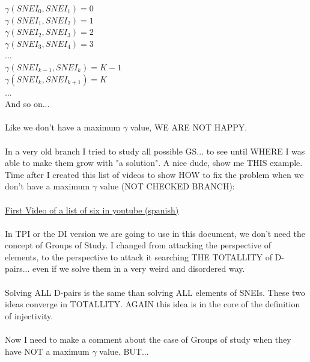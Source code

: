 		\noindent
		$\gamma(SNEI_{0}, SNEI_{1})= 0$\\
		$\gamma(SNEI_{1}, SNEI_{2})= 1$\\
		$\gamma(SNEI_{2}, SNEI_{3})= 2$\\
		$\gamma(SNEI_{3}, SNEI_{4})= 3$\\
		...\\
		$\gamma(SNEI_{k-1}, SNEI_{k})= K-1$\\
		$\gamma(SNEI_{k}, SNEI_{k+1})= K$\\
		...\\
		And so on...
		\\\\
		
		\noindent
		Like we don't have a maximum $\gamma$ value, WE ARE NOT HAPPY.
		\\\\
		
		\noindent
		In a very old branch I tried to study all possible GS... to see until WHERE I was able to make them grow with "a solution". A nice dude, show me THIS example. Time after I created this list of videos to show HOW to fix the problem when we don't have a maximum $\gamma$ value (NOT CHECKED BRANCH):\\\\
		\href{https://www.youtube.com/watch?v=reRUUKGFXf0&list=PLcEv5UNDUdw68yFXf2kYGDZVyIGpCfGdy&pp=0gcJCbEEOCosWNin}{First Video of a list of six in youtube (spanish)}
		\\\\
		
		\noindent
		In TPI or the DI version we are going to use in this document, we don't need the concept of Groups of Study. I changed from attacking the perspective of elements, to the perspective to attack it searching THE TOTALLITY of D-pairs... even if we solve them in a very weird and disordered way.
		\\\\
		
		\noindent
		Solving ALL D-pairs is the same than solving ALL elements of SNEIs. These two ideas converge in TOTALLITY. AGAIN this idea is in the core of the definition of injectivity.
		\\\\
		
		\noindent
		Now I need to make a comment about the case of Groups of study when they have NOT a maximum $\gamma$ value. BUT...
		\\\\
		
